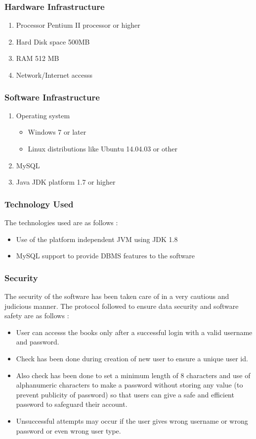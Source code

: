 \documentclass[a4paper]{article}
\begin{document}
\subsubsection{Hardware Infrastructure}
\begin {enumerate}
	\item Processor Pentium II processor or higher
	\item Hard Disk space 500MB
	\item RAM 512 MB
	\item Network/Internet accesss
\end{enumerate}
\subsubsection{Software Infrastructure}
\begin{enumerate}
	\item Operating system
		\begin{itemize}
		\item  Windows 7 or later
		\item Linux distributions like Ubuntu 14.04.03 or other
		\end{itemize}
	\item MySQL
	\item Java JDK platform 1.7 or higher
	\end{enumerate}
\subsubsection{Technology Used}
The technologies used are as follows :
\begin{itemize}
\item Use of the platform independent JVM using JDK 1.8
\item MySQL support to provide DBMS features to the software
\end{itemize}
\subsubsection{Security}
The security of the software has been taken care of in a very cautious and judicious manner. The protocol followed to ensure data security and software safety are as follows :
\begin{itemize}
\item User can accesss the books only after a successful login with a valid username and password.
\item Check has been done during creation of new user to ensure a unique user id.
\item Also check has been done to set a minimum length of 8 characters and use of alphanumeric characters to make a password without storing any value (to prevent publicity of password) so that users can give a safe and efficient password to safeguard their account. 
\item Unsuccessful attempts may occur if the user gives wrong username or wrong password or even wrong user type.
\end{itemize}
\end{document}
